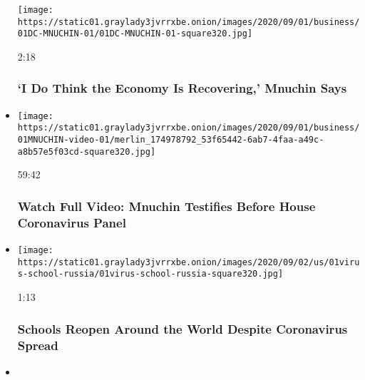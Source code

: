 \begin{itemize}
  \texttt{[image: https://static01.graylady3jvrrxbe.onion/images/2020/09/01/business/01DC-MNUCHIN-01/01DC-MNUCHIN-01-square320.jpg]}

  2:18

  \hypertarget{i-do-think-the-economy-is-recovering-mnuchin-says}{%
  \subsubsection{`I Do Think the Economy Is Recovering,' Mnuchin
  Says}\label{i-do-think-the-economy-is-recovering-mnuchin-says}}
\item
  \href{https://www.nytimes3xbfgragh.onion/video/us/politics/100000007318527/mnuchin-coronavirus-stimulus-video.html?action=click\&module=video-series-bar\&region=header\&pgtype=Article\&playlistId=video/coronavirus-news-update}{}

  \texttt{[image: https://static01.graylady3jvrrxbe.onion/images/2020/09/01/business/01MNUCHIN-video-01/merlin\_174978792\_53f65442-6ab7-4faa-a49c-a8b57e5f03cd-square320.jpg]}

  59:42

  \hypertarget{watch-full-video-mnuchin-testifies-before-house-coronavirus-panel}{%
  \subsubsection{Watch Full Video: Mnuchin Testifies Before House
  Coronavirus
  Panel}\label{watch-full-video-mnuchin-testifies-before-house-coronavirus-panel}}
\item
  \href{https://www.nytimes3xbfgragh.onion/video/world/europe/100000007318835/schools-reopen-worldwide-despite-coronavirus.html?action=click\&module=video-series-bar\&region=header\&pgtype=Article\&playlistId=video/coronavirus-news-update}{}

  \texttt{[image: https://static01.graylady3jvrrxbe.onion/images/2020/09/02/us/01virus-school-russia/01virus-school-russia-square320.jpg]}

  1:13

  \hypertarget{schools-reopen-around-the-world-despite-coronavirus-spread}{%
  \subsubsection{Schools Reopen Around the World Despite Coronavirus
  Spread}\label{schools-reopen-around-the-world-despite-coronavirus-spread}}
\item
  \href{https://www.nytimes3xbfgragh.onion/video/health/100000007293397/covid-pandemics-causes-documentary.html?action=click\&module=video-series-bar\&region=header\&pgtype=Article\&playlistId=video/coronavirus-news-update}{}


\end{itemize}
